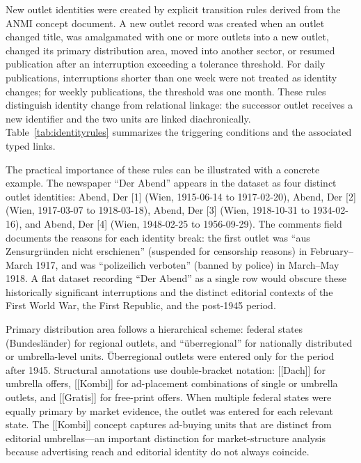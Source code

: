 \documentclass[11pt]{article}
\begin{document}
New outlet identities were created by explicit transition rules derived from the ANMI concept document. A new outlet record was created when an outlet changed title, was amalgamated with one or more outlets into a new outlet, changed its primary distribution area, moved into another sector, or resumed publication after an interruption exceeding a tolerance threshold. For daily publications, interruptions shorter than one week were not treated as identity changes; for weekly publications, the threshold was one month. These rules distinguish identity change from relational linkage: the successor outlet receives a new identifier and the two units are linked diachronically. Table~\ref{tab:identityrules} summarizes the triggering conditions and the associated typed links.

The practical importance of these rules can be illustrated with a concrete example. The newspaper ``Der Abend'' appears in the dataset as four distinct outlet identities: Abend, Der [1] (Wien, 1915-06-14 to 1917-02-20), Abend, Der [2] (Wien, 1917-03-07 to 1918-03-18), Abend, Der [3] (Wien, 1918-10-31 to 1934-02-16), and Abend, Der [4] (Wien, 1948-02-25 to 1956-09-29). The comments field documents the reasons for each identity break: the first outlet was ``aus Zensurgr\"unden nicht erschienen'' (suspended for censorship reasons) in February--March 1917, and was ``polizeilich verboten'' (banned by police) in March--May 1918. A flat dataset recording ``Der Abend'' as a single row would obscure these historically significant interruptions and the distinct editorial contexts of the First World War, the First Republic, and the post-1945 period.

Primary distribution area follows a hierarchical scheme: federal states (Bundesl\"ander) for regional outlets, and ``\"uberregional'' for nationally distributed or umbrella-level units. \"Uberregional outlets were entered only for the period after 1945. Structural annotations use double-bracket notation: [[Dach]] for umbrella offers, [[Kombi]] for ad-placement combinations of single or umbrella outlets, and [[Gratis]] for free-print offers. When multiple federal states were equally primary by market evidence, the outlet was entered for each relevant state. The [[Kombi]] concept captures ad-buying units that are distinct from editorial umbrellas---an important distinction for market-structure analysis because advertising reach and editorial identity do not always coincide.
\end{document}
